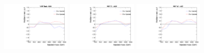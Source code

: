 \begin{figure}[htbp]
  \includegraphics[width=0.3\textwidth]{fig/fitValidation/biasSignalSigInject_VBFRadToWW_median.pdf}
  \includegraphics[width=0.3\textwidth]{fig/fitValidation/biasSignalSigInject_VBFZprToWW_median.pdf}
  \includegraphics[width=0.3\textwidth]{fig/fitValidation/biasSignalSigInject_VBFWprToWZ_median.pdf}\\
  \caption{
  }
  \label{fig:biasTest_injectedSignal}
\end{figure}
